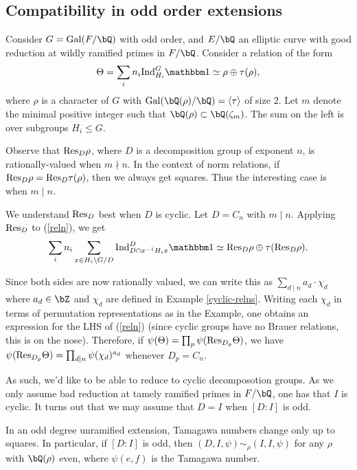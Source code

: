 \subsection{Compatibility in odd order extensions}

Consider $G = \Gal(F / \bQ)$ with odd order, and $E / \bQ$ an elliptic curve with good reduction at wildly ramified primes in $F / \bQ$. Consider a relation of the form
\begin{equation}\label{reln} 
    \Theta = \sum_i n_i \Ind_{H_i}^G \trivial \simeq \rho \oplus \tau(\rho),
\end{equation}
where $\rho$ is a character of $G$ with $\Gal(\bQ(\rho) / \bQ) = \langle \tau \rangle $ of size $2$. Let $m$ denote the minimal positive integer such that $\bQ(\rho) \subset \bQ(\zeta_m)$. The sum on the left is over subgroups $H_i \leq G$. 

Observe that $\mathrm{Res}_D\rho$, where $D$ is a decomposition group of exponent $n$, is rationally-valued when $m \nmid n$. In the context of norm relations, if $\mathrm{Res}_D\rho = \mathrm{Res}_D\tau(\rho)$, then we always get squares. Thus the interesting case is when $m \mid n$. 

We understand $\mathrm{Res}_D$ best when $D$ is cyclic. Let $D = C_n$ with $m \mid n$. Applying $\mathrm{Res}_D$ to (\ref{reln}), we get
\begin{equation}\label{reln-resD}
\sum_i n_i \sum_{x \in H_i \backslash G / D} \Ind_{D \cap x^{-1}H_i x}^D \trivial \simeq \Res_D \rho \oplus \tau(\Res_D \rho).
\end{equation}

Since both sides are now rationally valued, we can write this as $\sum_{d \mid n} a_d \cdot \chi_d$ where $a_d \in \bZ$ and $\chi_d$ are defined in Example \ref{cyclic-relns}. Writing each $\chi_d$ in terms of permutation representations as in the Example, one obtains an expression for the LHS of (\ref{reln}) (since cyclic groups have no Brauer relations, this is on the nose).
Therefore, if $\psi(\Theta) = \prod_p \psi(\mathrm{Res}_{D_p} \Theta)$, we have $\psi(\mathrm{Res}_{D_p} \Theta) = \prod_{d \mid n} \psi(\chi_d)^{a_d}$ whenever $D_p = C_n$.

As such, we'd like to be able to reduce to cyclic decomposotion groups. As we only assume bad reduction at tamely ramified primes in $F / \bQ$, one has that $I$ is cyclic. 
It turns out that we may assume that $D = I$ when $[D \colon I]$ is odd. 

\begin{lemma}\label{DeqI}
    In an odd degree unramified extension, Tamagawa numbers change only up to squares. In particular, if $[D \colon I]$ is odd, then $(D, I, \psi) \sim_{\rho} (I, I, \psi)$ for any $\rho$ with $\bQ(\rho)$ even, where $\psi(e,f)$ is the Tamagawa number. 
\end{lemma}

